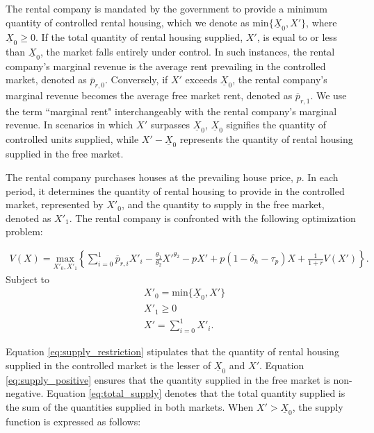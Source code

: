 \documentclass[parskip=full]{article}
\begin{document}
The rental company is mandated by the government to provide a minimum quantity of controlled rental housing, which we denote as $\mbox{min}\{\underline{X}_{0},X'\}$, where $\underline{X}_{0} \geq 0$. If the total quantity of rental housing supplied, $X'$, is equal to or less than $\underline{X}_{0}$, the market falls entirely under control. In such instances, the rental company's marginal revenue is the average rent prevailing in the controlled market, denoted as $\overline{p}_{r,0}$. Conversely, if $X'$ exceeds $\underline{X}_{0}$, the rental company's marginal revenue becomes the average free market rent, denoted as $\overline{p}_{r,1}$. We use the term ``marginal rent" interchangeably with the rental company's marginal revenue. In scenarios in which $X'$ surpasses $\underline{X}_{0}$, $\underline{X}_{0}$ signifies the quantity of controlled units supplied, while $X' - \underline{X}_{0}$ represents the quantity of rental housing supplied in the free market.

The rental company purchases houses at the prevailing house price, $p$. In each period, it determines the quantity of rental housing to provide in the controlled market, represented by $X'_{0}$, and the quantity to supply in the free market, denoted as $X'_{1}$. The rental company is confronted with the following optimization problem:

\begin{align}\label{eq:rental_company_problem}
V(X)=\underset{X'_{0},X'_{1}} {\text{$\mbox{max} $}}\left\{\sum_{i=0}^{1} \overline{p}_{r,i}X'_{i}-\frac{\theta_{1}}{\theta_{2}}X'^{\theta_{2}}-p X'+p(1-\delta_{h}-\tau_{p})X+\frac{1}{1+r}V(X')\right\}.
\end{align}
Subject to
\begin{align}
& X'_{0}=\mbox{min}\{\underline{X}_{0},X'\} \label{eq:supply_restriction} \\
& X'_{1} \geq 0 \label{eq:supply_positive} \\
& X'=\sum^{1}_{i=0} X'_{i}. \label{eq:total_supply} 
\end{align}

\noindent Equation \eqref{eq:supply_restriction} stipulates that the quantity of rental housing supplied in the controlled market is the lesser of $\underline{X}_{0}$ and $X'$. Equation \eqref{eq:supply_positive} ensures that the quantity supplied in the free market is non-negative. Equation \eqref{eq:total_supply} denotes that the total quantity supplied is the sum of the quantities supplied in both markets. When $X'>\underline{X}_{0}$, the supply function is expressed as follows:
\end{document}

